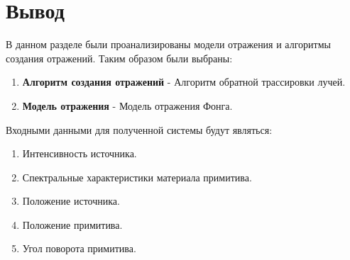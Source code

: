 \section*{Вывод}

В данном разделе были проанализированы модели отражения и алгоритмы создания отражений.
Таким образом были выбраны:
\begin{enumerate}
	\item \textbf{Алгоритм создания отражений} - Алгоритм обратной трассировки лучей.
	\item \textbf{Модель отражения} - Модель отражения Фонга.
\end{enumerate}


Входными данными для полученной системы будут являться:
\begin{enumerate}
	\item Интенсивность источника.
	\item Спектральные характеристики материала примитива.
	\item Положение источника.
	\item Положение примитива.
	\item Угол поворота примитива.
\end{enumerate}